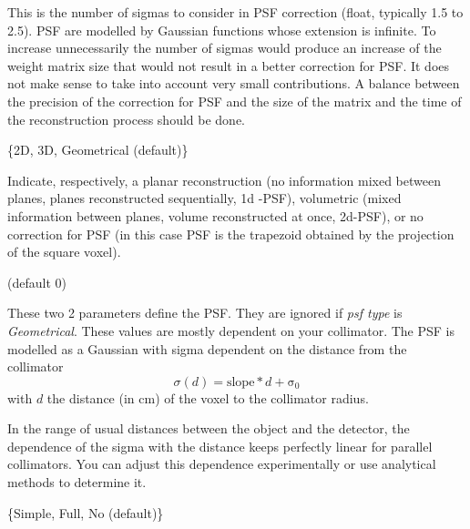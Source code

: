 \documentclass{article}
\begin{document}
{{\begin{description}
This is the number of sigmas to consider in PSF correction (float, typically 1.5 to 2.5). PSF are modelled by Gaussian functions whose extension is infinite. To increase unnecessarily the number of sigmas would produce an increase of the weight matrix size that would not result in a better correction for PSF. It does not make sense to take into account very small contributions. A balance between the precision of the correction for PSF and the size of the matrix and the time of the reconstruction process should be done.


\item[psf type] \{2D, 3D, Geometrical (default)\}

Indicate, respectively, a planar reconstruction (no information mixed between planes, planes reconstructed sequentially, 1d -PSF), volumetric (mixed information between planes, volume reconstructed at once, 2d-PSF), or no correction for PSF (in this case PSF is the trapezoid obtained by the projection of the square voxel).

\item[collimator slope, collimator slope sigma 0 (cm)] (default 0)

These two 2 parameters define the PSF. They are ignored if \textit{psf type} is \textit{Geometrical}. These values are mostly dependent on your collimator. The PSF is modelled as a Gaussian with sigma dependent on the distance from the collimator
\begin{equation}
 \sigma(d) = \mathrm{slope} * d + \mathrm{\sigma_0}
\end{equation} 
\noindent with $d$ the distance (in cm) of the voxel to the collimator radius.

In the range of usual distances between the object and the detector, the dependence of the sigma with the distance keeps perfectly linear for parallel collimators. You can adjust this dependence experimentally or use analytical methods to determine it.

\item[attenuation type] \{Simple, Full, No (default)\}


\end{description}}}
\end{document}
